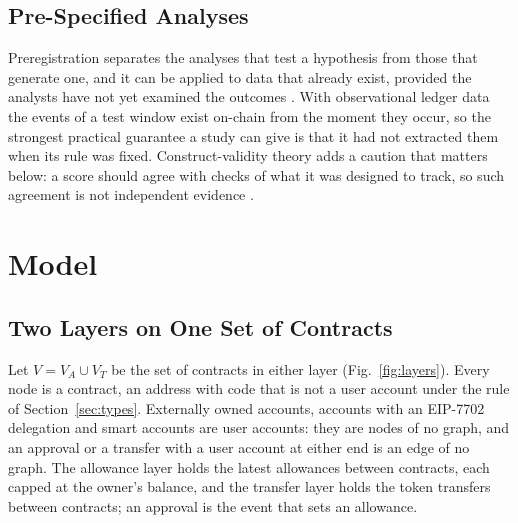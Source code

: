 \documentclass{ieeeaccess}
\begin{document}
\subsection{Pre-Specified Analyses}
Preregistration separates the analyses that test a hypothesis from those that generate one, and it can be applied to data that already exist, provided the analysts have not yet examined the outcomes \cite{nosek2018preregistration}. With observational ledger data the events of a test window exist on-chain from the moment they occur, so the strongest practical guarantee a study can give is that it had not extracted them when its rule was fixed. Construct-validity theory adds a caution that matters below: a score should agree with checks of what it was designed to track, so such agreement is not independent evidence \cite{cronbach1955construct}.

\section{Model}
\label{sec:model}

\subsection{Two Layers on One Set of Contracts}
Let $V=V_A\cup V_T$ be the set of contracts in either layer (Fig.~\ref{fig:layers}). Every node is a contract, an address with code that is not a user account under the rule of Section~\ref{sec:types}. Externally owned accounts, accounts with an EIP-7702 delegation and smart accounts are user accounts: they are nodes of no graph, and an approval or a transfer with a user account at either end is an edge of no graph. The allowance layer holds the latest allowances between contracts, each capped at the owner's balance, and the transfer layer holds the token transfers between contracts; an approval is the event that sets an allowance.
\end{document}
